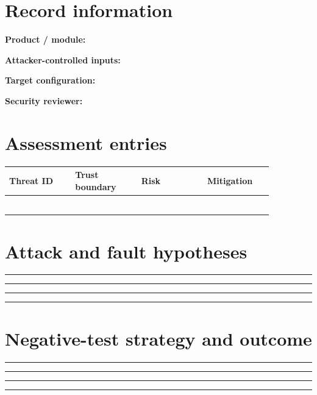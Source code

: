 \documentclass[10pt,letterpaper]{article}
\begin{document}
\makedoctitle
\makedocsummary
\section{Record information}
\noindent\textbf{Product / module:}\quad\hrulefill\par\vspace{11pt}
\noindent\textbf{Attacker-controlled inputs:}\quad\hrulefill\par\vspace{11pt}
\noindent\textbf{Target configuration:}\quad\hrulefill\par\vspace{11pt}
\noindent\textbf{Security reviewer:}\quad\hrulefill\par\vspace{11pt}
\section{Assessment entries}
\begin{longtable}{|p{0.215\linewidth}|p{0.215\linewidth}|p{0.215\linewidth}|p{0.215\linewidth}|}
\hline
\textbf{Threat ID} & \textbf{Trust boundary} & \textbf{Risk} & \textbf{Mitigation}\\\hline
\endhead
\rule{0pt}{27pt} & & & \\\hline
\rule{0pt}{27pt} & & & \\\hline
\rule{0pt}{27pt} & & & \\\hline
\rule{0pt}{27pt} & & & \\\hline
\rule{0pt}{27pt} & & & \\\hline
\rule{0pt}{27pt} & & & \\\hline
\end{longtable}
\section{Attack and fault hypotheses}
\noindent\rule{\linewidth}{0.4pt}\par\vspace{16pt}
\noindent\rule{\linewidth}{0.4pt}\par\vspace{16pt}
\noindent\rule{\linewidth}{0.4pt}\par\vspace{16pt}
\noindent\rule{\linewidth}{0.4pt}\par\vspace{16pt}
\section{Negative-test strategy and outcome}
\noindent\rule{\linewidth}{0.4pt}\par\vspace{16pt}
\noindent\rule{\linewidth}{0.4pt}\par\vspace{16pt}
\noindent\rule{\linewidth}{0.4pt}\par\vspace{16pt}
\noindent\rule{\linewidth}{0.4pt}\par\vspace{16pt}
\end{document}
